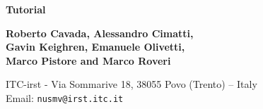 \begin{titlepage}
\begin{center}
  \begin{Huge}
  {\bf \NuSMV Tutorial}\\
  \end{Huge}
  \vspace{0.5cm}
  \vspace{4.0cm}

  \begin{Large}
  {\bf Roberto Cavada, Alessandro Cimatti,\\ 
  Gavin Keighren, Emanuele Olivetti,\\
  Marco Pistore and Marco Roveri}
  \end{Large}

  \vspace{1cm}
  {ITC-irst - Via Sommarive 18, 38055 Povo (Trento) -- Italy}\\

  \vspace{1cm}
  Email: {\tt nusmv@irst.itc.it}\\
  \vspace{4.0cm}
\end{center}
\vspace{1in}
\end{titlepage}

